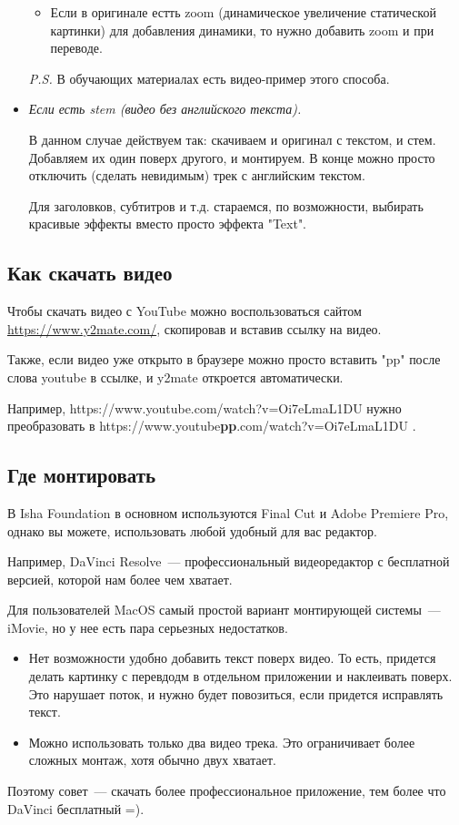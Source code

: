 \documentclass[
a4paper, %
12pt, %
article,
onecolumn, %
openany, %
]{memoir}
\begin{document}
\begin{itemize}
\begin{itemize}
            \item Если в оригинале естть zoom (динамическое увеличение
                статической картинки) для добавления динамики, то нужно
                добавить zoom и при переводе.

        \end{itemize}
        \textit{P.S.} В обучающих материалах есть видео-пример этого способа.

    \item \emph{Если есть stem (видео без английского текста).}

        В данном случае действуем так: скачиваем и оригинал с текстом,
        и стем. Добавляем их один поверх другого, и монтируем. В конце
        можно просто отключить (сделать невидимым) трек
        с английским текстом.

        Для заголовков, субтитров и т.д. стараемся, по возможности,
        выбирать красивые эффекты вместо просто эффекта "Text".
\end{itemize}

\subsection{Как скачать видео}
Чтобы скачать видео с YouTube можно воспользоваться сайтом
\href{https://www.y2mate.com/}{https://www.y2mate.com/}, скопировав и вставив
ссылку на видео.

Также, если видео уже открыто в браузере можно просто вставить "pp" после
слова youtube в ссылке, и y2mate откроется автоматически.

Например, https://www.youtube.com/watch?v=Oi7eLmaL1DU нужно преобразовать
в https://www.youtube\textbf{pp}.com/watch?v=Oi7eLmaL1DU .

\subsection{Где монтировать}
В Isha Foundation в основном используются Final Cut и Adobe Premiere Pro,
однако вы можете, использовать любой удобный для вас редактор.

Например, DaVinci Resolve~---
профессиональный видеоредактор с бесплатной версией, которой нам более чем хватает.

Для пользователей MacOS самый простой вариант монтирующей системы~---
iMovie, но у нее есть пара серьезных недостатков.
\begin{itemize}
    \item Нет возможности удобно добавить текст поверх видео.
        То есть, придется делать
        картинку с перевдодм в отдельном приложении и наклеивать поверх.
        Это нарушает поток, и нужно будет повозиться, если придется исправлять текст.
    \item Можно использовать только два видео трека. Это ограничивает более
        сложных монтаж, хотя обычно двух хватает.
\end{itemize}
Поэтому совет~--- скачать более профессиональное приложение, тем более что
DaVinci бесплатный =).
\end{document}
